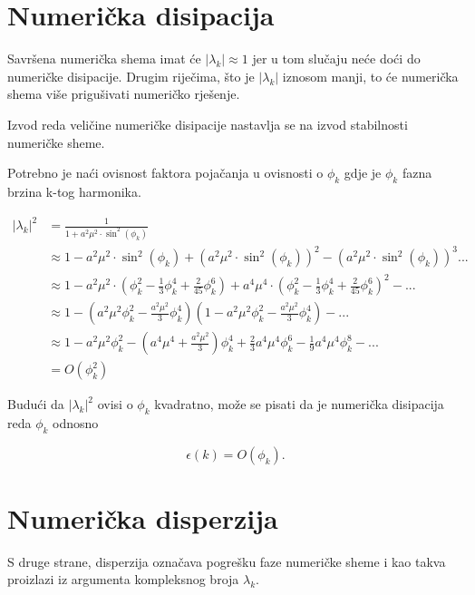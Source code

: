 \documentclass{article}
\begin{document}
\section{Numerička disipacija}

Savršena numerička shema imat će $|\lambda_k| \approx 1$ jer u tom slučaju neće
doći do numeričke disipacije. Drugim riječima, što je $|\lambda_k|$ iznosom
manji, to će numerička shema više prigušivati numeričko rješenje.

Izvod reda veličine numeričke disipacije nastavlja se na izvod stabilnosti
numeričke sheme.

Potrebno je naći ovisnost faktora pojačanja u ovisnosti o $\phi_k$ gdje je
$\phi_k$ fazna brzina k-tog harmonika.

\begin{align*}
    |\lambda_k|^2 &= \frac{1}{1 + a^2 \mu^2 \cdot \sin^2(\phi_k)} \\
    &\approx 1 - a^2 \mu ^2 \cdot \sin^2(\phi_k) +
        \left(a^2 \mu ^2 \cdot \sin^2(\phi_k)\right)^2 -
        \left(a^2 \mu ^2 \cdot \sin^2(\phi_k)\right)^3... \\
    &\approx 1 -
        a^2 \mu^2 \cdot
        \left(\phi_k^2 - \frac{1}{3} \phi_k^4 + \frac{2}{45} \phi_k^6\right) +
        a^4 \mu^4 \cdot
        \left(\phi_k^2 - \frac{1}{3} \phi_k^4 + \frac{2}{45} \phi_k^6\right)^2
        - ... \\
    &\approx 1 -
        \left(a^2 \mu^2 \phi_k^2 - \frac{a^2 \mu^2}{3} \phi_k^4\right)
        \left(1 - a^2 \mu^2 \phi_k^2 - \frac{a^2 \mu^2}{3} \phi_k^4\right)
        - ... \\
    &\approx 1 - a^2\mu^2 \phi_k^2 -
        \left(a^4 \mu^4 + \frac{a^2 \mu^2}{3}\right) \phi_k^4
        + \frac{2}{3} a^4 \mu^4 \phi_k^6 - \frac{1}{9}a^4 \mu^4 \phi_k^8
        - ... \\
    &= O\left(\phi_k^2\right)
\end{align*}

Budući da $|\lambda_k|^2$ ovisi o $\phi_k$ kvadratno, može se pisati da je
numerička disipacija reda $\phi_k$ odnosno

\begin{equation}
    \epsilon(k) = O(\phi_k).
\end{equation}

\section{Numerička disperzija}

S druge strane, disperzija označava pogrešku faze numeričke sheme i kao takva
proizlazi iz argumenta kompleksnog broja $\lambda_k$.
\end{document}
